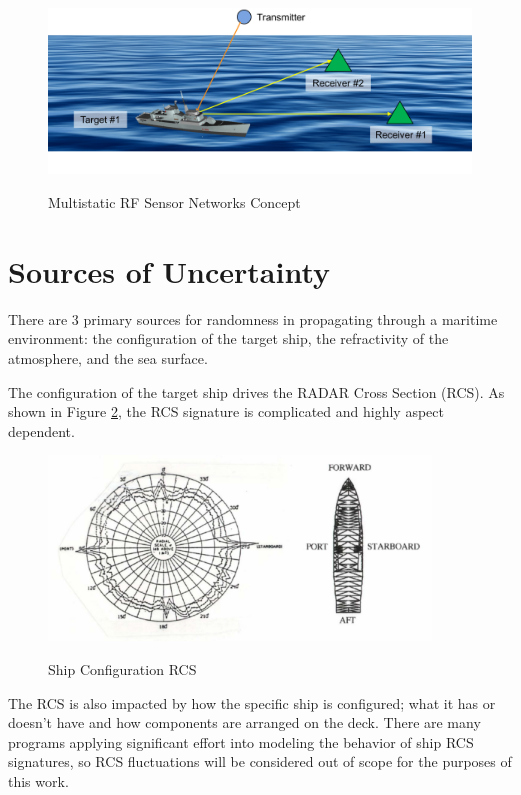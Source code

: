 \begin{figure}[H]
  \begin{center}
\includegraphics[width=5in]{../media/multistatic/ms_rf_concept.png}
  \end{center}
  \renewcommand{\baselinestretch}{1} \small\normalsize
  \begin{quote}
    \caption[Multistatic RF Sensor Networks Concept]{Multistatic RF Sensor Networks Concept\label{ms_fig:1}}
  \end{quote}
\end{figure}
\renewcommand{\baselinestretch}{2} \small\normalsize

\section{Sources of Uncertainty}
There are 3 primary sources for randomness in propagating through a maritime environment: the configuration of the target ship, the refractivity of the atmosphere, and the sea surface.

The configuration of the target ship drives the RADAR Cross Section (RCS). As shown in Figure \ref{rmt_fig:1}, the RCS signature is complicated and highly aspect dependent. 
\begin{figure}[H]
  \begin{center}
\includegraphics[width=4in]{../media/multistatic/shipconfig.png}
  \end{center}
  \renewcommand{\baselinestretch}{1} \small\normalsize
  \begin{quote}
    \caption[Ship Configuration RCS]{Ship Configuration RCS\label{rmt_fig:1}}
  \end{quote}
\end{figure}
\renewcommand{\baselinestretch}{2} \small\normalsize
The RCS is also impacted by how the specific ship is configured; what it has or doesn't have and how components are arranged on the deck. There are many programs applying significant effort into modeling the behavior of ship RCS signatures, so RCS fluctuations will be considered out of scope for the purposes of this work.

